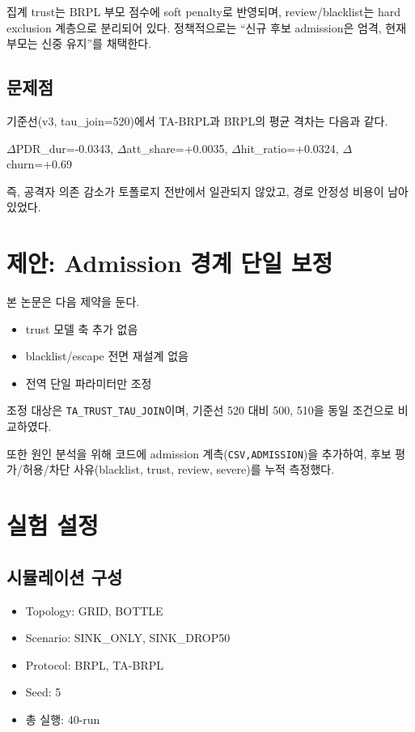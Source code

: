 \documentclass[12pt,a4paper]{article}
\begin{document}
집계 trust는 BRPL 부모 점수에 soft penalty로 반영되며,
review/blacklist는 hard exclusion 계층으로 분리되어 있다.
정책적으로는 ``신규 후보 admission은 엄격, 현재 부모는 신중 유지''를 채택한다.

\subsection{문제점}
기준선(v3, tau\_join=520)에서 TA-BRPL과 BRPL의 평균 격차는 다음과 같다.
\begin{center}
$\Delta$PDR\_dur=-0.0343,\;
$\Delta$att\_share=+0.0035,\;
$\Delta$hit\_ratio=+0.0324,\;
$\Delta$churn=+0.69
\end{center}
즉, 공격자 의존 감소가 토폴로지 전반에서 일관되지 않았고,
경로 안정성 비용이 남아 있었다.

\section{제안: Admission 경계 단일 보정}
본 논문은 다음 제약을 둔다.
\begin{itemize}
  \item trust 모델 축 추가 없음
  \item blacklist/escape 전면 재설계 없음
  \item 전역 단일 파라미터만 조정
\end{itemize}

조정 대상은 \texttt{TA\_TRUST\_TAU\_JOIN}이며,
기준선 520 대비 500, 510을 동일 조건으로 비교하였다.

또한 원인 분석을 위해 코드에 admission 계측(\texttt{CSV,ADMISSION})을 추가하여,
후보 평가/허용/차단 사유(blacklist, trust, review, severe)를 누적 측정했다.

\section{실험 설정}
\subsection{시뮬레이션 구성}
\begin{itemize}
  \item Topology: GRID, BOTTLE
  \item Scenario: SINK\_ONLY, SINK\_DROP50
  \item Protocol: BRPL, TA-BRPL
  \item Seed: 5
  \item 총 실행: 40-run
\end{itemize}
\end{document}
